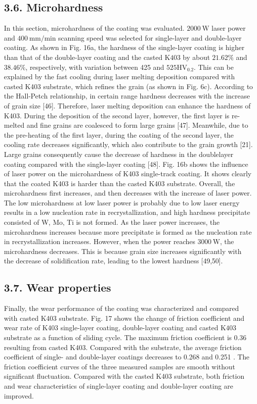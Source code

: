 \documentclass[10pt]{article}
\begin{document}
\subsection*{3.6. Microhardness}
In this section, microhardness of the coating was evaluated. $2000 \mathrm{~W}$ laser power and $400 \mathrm{~mm} / \mathrm{min}$ scanning speed was selected for single-layer and double-layer coating. As shown in Fig. 16a, the hardness of the single-layer coating is higher than that of the double-layer coating and the casted $\mathrm{K} 403$ by about $21.62 \%$ and $38.46 \%$, respectively, with variation between 425 and $525 \mathrm{HV}_{0.2}$. This can be explained by the fast cooling during laser melting deposition compared with casted K403 substrate, which refines the grain (as shown in Fig. 6c). According to the Hall-Petch relationship, in certain range hardness decreases with the increase of grain size [46]. Therefore, laser melting deposition can enhance the hardness of K403. During the deposition of the second layer, however, the first layer is re-melted and fine grains are coalesced to form large grains [47]. Meanwhile, due to the pre-heating of the first layer, during the coating of the second layer, the cooling rate decreases significantly, which also contribute to the grain growth [21]. Large grains consequently cause the decrease of hardness in the doublelayer coating compared with the single-layer coating [48]. Fig. 16b shows the influence of laser power on the microhardness of K403 single-track coating. It shows clearly that the coated K403 is harder than the casted K403 substrate. Overall, the microhardness first increases, and then decreases with the increase of laser power. The low microhardness at low laser power is probably due to low laser energy results in a low nucleation rate in recrystallization, and high hardness precipitate consisted of W, Mo, Ti is not formed. As the laser power increases, the microhardness increases because more precipitate is formed as the nucleation rate in recrystallization increases. However, when the power reaches $3000 \mathrm{~W}$, the microhardness decreases. This is because grain size increases significantly with the decrease of solidification rate, leading to the lowest hardness [49,50].

\subsection*{3.7. Wear properties}
Finally, the wear performance of the coating was characterized and compared with casted K403 substrate. Fig. 17 shows the change of friction coefficient and wear rate of K403 single-layer coating, double-layer coating and casted $\mathrm{K} 403$ substrate as a function of sliding cycle. The maximum friction coefficient is 0.36 resulting from casted K403. Compared with the substrate, the average friction coefficient of single- and double-layer coatings decreases to 0.268 and 0.251 . The friction coefficient curves of the three measured samples are smooth without significant fluctuation. Compared with the casted K403 substrate, both friction and wear characteristics of single-layer coating and double-layer coating are improved.
\end{document}
